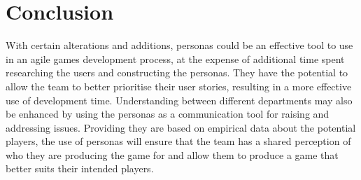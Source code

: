 \documentclass{scrartcl}
\begin{document}
\section{Conclusion}
With certain alterations and additions, personas could be an effective tool to use in an agile games development process, at the expense of additional time spent researching the users and constructing the personas. They have the potential to allow the team to better prioritise their user stories, resulting in a more effective use of development time. Understanding between different departments may also be enhanced by using the personas as a communication tool for raising and addressing issues. Providing they are based on empirical data about the potential players, the use of personas will ensure that the team has a shared perception of who they are producing the game for and allow them to produce a game that better suits their intended players.


\end{document}
